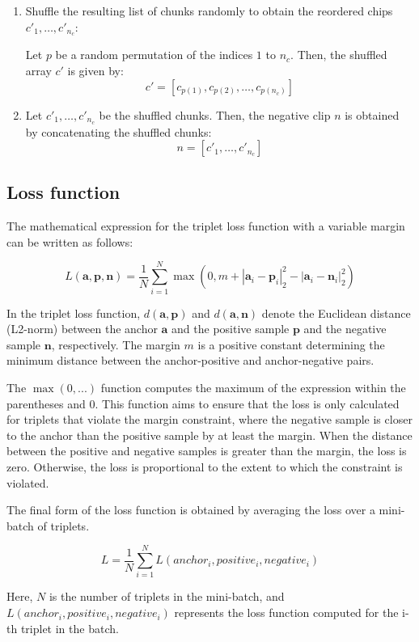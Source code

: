 \begin{enumerate}
\item Shuffle the resulting list of chunks randomly to obtain the reordered chips $c'_1,\ldots,c'_{n_c}$:

Let $p$ be a random permutation of the indices $1$ to $n_c$. Then, the shuffled array $c'$ is given by:
\begin{equation}
c' = [c_{p(1)}, c_{p(2)}, \dots, c_{p(n_c)}]
\end{equation}


\item Let $c'_1, \dots, c'_{n_c}$ be the shuffled chunks. Then, the negative clip $n$ is obtained by concatenating the shuffled chunks:
\begin{equation}
n = [c'_1, \dots, c'_{n_c}]
\end{equation}


\end{enumerate}

\subsection{Loss function}

The mathematical expression for the triplet loss function with a variable margin can be written as follows:

\begin{equation}
L(\mathbf{a}, \mathbf{p}, \mathbf{n}) = \frac{1}{N} \sum_{i=1}^{N} \max \left(0, m + \left| \mathbf{a}_i - \mathbf{p}_i \right|_2^2 - \left| \mathbf{a}_i - \mathbf{n}_i \right|_2^2 \right)
\end{equation}

In the triplet loss function, $d(\mathbf{a}, \mathbf{p})$ and $d(\mathbf{a}, \mathbf{n})$ denote the Euclidean distance (L2-norm) between the anchor $\mathbf{a}$ and the positive sample $\mathbf{p}$ and the negative sample $\mathbf{n}$, respectively. The margin $m$ is a positive constant determining the minimum distance between the anchor-positive and anchor-negative pairs.

The $\max(0, ...)$ function computes the maximum of the expression within the parentheses and 0. This function aims to ensure that the loss is only calculated for triplets that violate the margin constraint, where the negative sample is closer to the anchor than the positive sample by at least the margin. When the distance between the positive and negative samples is greater than the margin, the loss is zero. Otherwise, the loss is proportional to the extent to which the constraint is violated.

The final form of the loss function is obtained by averaging the loss over a mini-batch of triplets. 

\begin{equation}
L = \frac{1}{N} \sum_{i=1}^{N} L(anchor_i, positive_i, negative_i)
\end{equation}

Here, $N$ is the number of triplets in the mini-batch, and $L(anchor_i, positive_i, negative_i)$ represents the loss function computed for the i-th triplet in the batch.